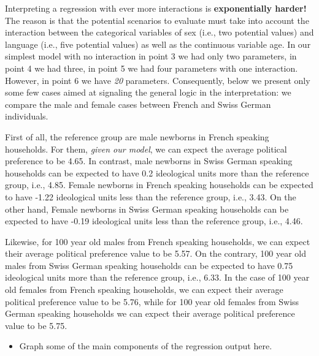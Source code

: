\documentclass[
]{book}
\providecommand{\tightlist}{%
  \setlength{\itemsep}{0pt}\setlength{\parskip}{0pt}}
\begin{document}
Interpreting a regression with ever more interactions is \textbf{exponentially harder!} The reason is that the potential scenarios to evaluate must take into account the interaction between the categorical variables of sex (i.e., two potential values) and language (i.e., five potential values) as well as the continuous variable age. In our simplest model with no interaction in point 3 we had only two parameters, in point 4 we had three, in point 5 we had four parameters with one interaction. However, in point 6 we have \emph{20} parameters. Consequently, below we present only some few cases aimed at signaling the general logic in the interpretation: we compare the male and female cases between French and Swiss German individuals.

First of all, the reference group are male newborns in French speaking households. For them, \emph{given our model}, we can expect the average political preference to be 4.65. In contrast, male newborns in Swiss German speaking households can be expected to have 0.2 ideological units more than the reference group, i.e., 4.85. Female newborns in French speaking households can be expected to have -1.22 ideological units less than the reference group, i.e., 3.43. On the other hand, Female newborns in Swiss German speaking households can be expected to have -0.19 ideological units less than the reference group, i.e., 4.46.

Likewise, for 100 year old males from French speaking households, we can expect their average political preference value to be 5.57. On the contrary, 100 year old males from Swiss German speaking households can be expected to have 0.75 ideological units more than the reference group, i.e., 6.33. In the case of 100 year old females from French speaking households, we can expect their average political preference value to be 5.76, while for 100 year old females from Swiss German speaking households we can expect their average political preference value to be 5.75.

\begin{itemize}
\tightlist
\item
  Graph some of the main components of the regression output here.
\end{itemize}
\end{document}
